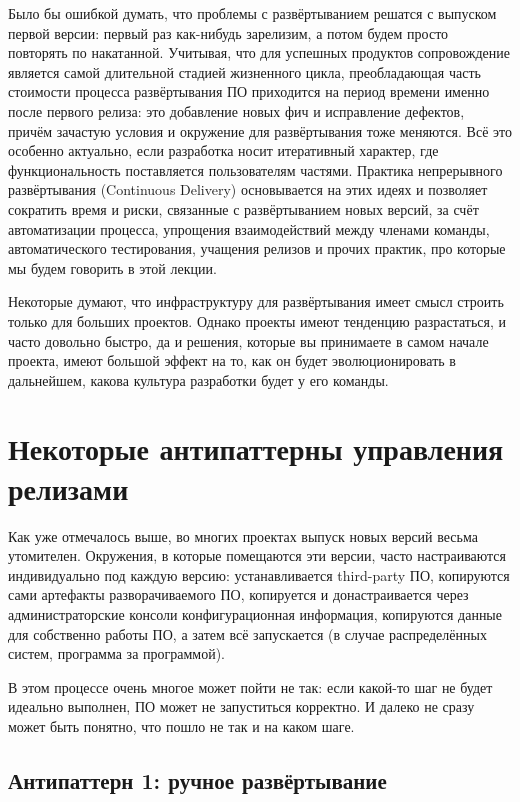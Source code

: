 \documentclass{../../text-style}
\begin{document}
Было бы ошибкой думать, что проблемы с развёртыванием решатся с выпуском первой версии: первый раз как-нибудь зарелизим, а потом будем просто повторять по накатанной. Учитывая, что для успешных продуктов сопровождение является самой длительной стадией жизненного цикла, преобладающая часть стоимости процесса развёртывания ПО приходится на период времени именно после первого релиза: это добавление новых фич и исправление дефектов, причём зачастую условия и окружение для развёртывания тоже меняются. Всё это особенно актуально, если разработка носит итеративный характер, где функциональность поставляется пользователям частями. Практика непрерывного развёртывания (Continuous Delivery) основывается на этих идеях и позволяет сократить время и риски, связанные с развёртыванием новых версий, за счёт автоматизации процесса, упрощения взаимодействий между членами команды, автоматического тестирования, учащения релизов и прочих практик, про которые мы будем говорить в этой лекции.

Некоторые думают, что инфраструктуру для развёртывания имеет смысл строить только для больших проектов. Однако проекты имеют тенденцию разрастаться, и часто довольно быстро, да и решения, которые вы принимаете в самом начале проекта, имеют большой эффект на то, как он будет эволюционировать в дальнейшем, какова культура разработки будет у его команды.

\section{Некоторые антипаттерны управления релизами}

Как уже отмечалось выше, во многих проектах выпуск новых версий весьма утомителен. Окружения, в которые помещаются эти версии, часто настраиваются индивидуально под каждую версию: устанавливается third-party ПО, копируются сами артефакты разворачиваемого ПО, копируется и донастраивается через администраторские консоли конфигурационная информация, копируются данные для собственно работы ПО, а затем всё запускается (в случае распределённых систем, программа за программой).

В этом процессе очень многое может пойти не так: если какой-то шаг не будет идеально выполнен, ПО может не запуститься корректно. И далеко не сразу может быть понятно, что пошло не так и на каком шаге.

\subsection{Антипаттерн 1: ручное развёртывание}
\end{document}
